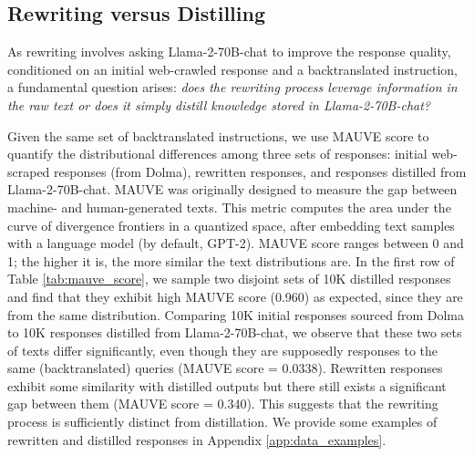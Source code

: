 \subsection{Rewriting versus Distilling}\label{rewrite_vs_distill}
As rewriting involves asking Llama-2-70B-chat to improve the response quality, conditioned on an initial web-crawled response and a backtranslated instruction, a fundamental question arises: \emph{does the rewriting process leverage information in the raw text or does it simply distill knowledge stored in Llama-2-70B-chat?}

Given the same set of backtranslated instructions, we use MAUVE score \cite{pillutla2021mauve} to quantify the distributional differences among three sets of responses: initial web-scraped responses (from Dolma), rewritten responses, and responses distilled from Llama-2-70B-chat. MAUVE was originally designed to measure the gap between machine- and human-generated texts. This metric computes the area under the curve of divergence frontiers in a quantized space, after embedding text samples with a language model (by default, GPT-2). MAUVE score ranges between 0 and 1; the higher it is, the more similar the text distributions are. In the first row of Table \ref{tab:mauve_score}, we sample two disjoint sets of 10K distilled responses and find that they exhibit high MAUVE score (0.960) as expected, since they are from the same distribution. Comparing 10K initial responses sourced from Dolma to 10K responses distilled from Llama-2-70B-chat, we observe that these two sets of texts differ significantly, even though they are supposedly responses to the same (backtranslated) queries (MAUVE score = 0.0338). Rewritten responses exhibit some similarity with distilled outputs but there still exists a significant gap between them (MAUVE score = 0.340). %
This suggests that the rewriting process is sufficiently distinct from distillation. We provide some examples of rewritten and distilled responses in Appendix \ref{app:data_examples}.
